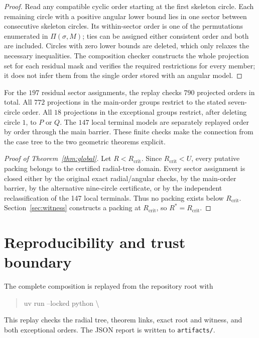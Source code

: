 \documentclass[11pt,a4paper]{article}
\theoremstyle{remark}
\newcommand{\Ropt}{R^*}
\newcommand{\Rcrit}{R_{\mathrm{crit}}}
\newcommand{\Rcap}{U}
\begin{document}
\begin{proof}
Read any compatible cyclic order starting at the first skeleton circle.
Each remaining circle with a positive angular lower bound lies in one sector
between consecutive skeleton circles.  Its within-sector order is one of the
permutations enumerated in $\Pi(\sigma,M)$; ties can be assigned either
consistent order and both are included.  Circles with zero lower bounds are
deleted, which only relaxes the necessary inequalities.  The composition
checker constructs the whole projection set for each residual mask and
verifies the required restrictions for every member; it does not infer them
from the single order stored with an angular model.
\end{proof}

For the $197$ residual sector assignments, the replay checks $790$ projected
orders in total.  All $772$ projections in the main-order groups restrict to
the stated seven-circle order.  All $18$ projections in the exceptional
groups restrict, after deleting circle $1$, to $P$ or $Q$.  The $147$ local
terminal models are separately replayed order by order through the main
barrier.  These finite checks make the connection from the case tree to the
two geometric theorems explicit.



\begin{proof}[Proof of Theorem~\ref{thm:global}]
Let $R<\Rcrit$.  Since $\Rcrit<\Rcap$, every putative packing belongs to
the certified radial-tree domain.  Every sector assignment is closed either
by the original exact radial/angular checks, by the main-order barrier, by
the alternative nine-circle certificate, or by the independent
reclassification of the 147 local terminals.  Thus no packing exists below
$\Rcrit$.  Section~\ref{sec:witness} constructs a packing at $\Rcrit$, so
$\Ropt=\Rcrit$.
\end{proof}

\section{Reproducibility and trust boundary}
\label{sec:verification}

The complete composition is replayed from the repository root with
\begin{quote}\small\ttfamily
uv run --locked python \textbackslash\\
\hspace*{1em}
\end{quote}
This replay checks the radial tree, theorem links, exact root and witness,
and both exceptional orders.  The JSON report is written to
\texttt{artifacts/}.
\end{document}
